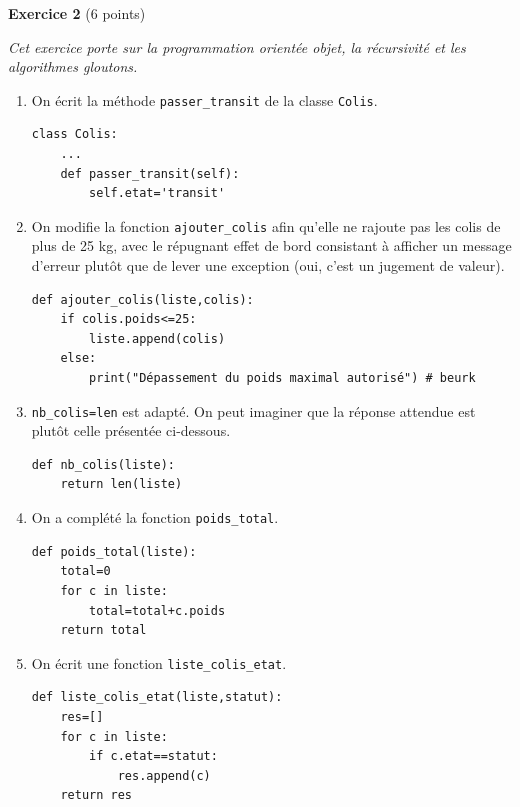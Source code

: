 \documentclass[11pt,a4paper]{article}
\newcommand{\mip}[1]{\texttt{#1}}
\begin{document}
\bigskip

\textbf{Exercice 2} (6 points)


\medskip

\textit{Cet exercice porte sur la programmation orientée objet, la récursivité et les algorithmes
gloutons.}



\begin{enumerate}
\item On écrit la méthode \mip{passer_transit} de la classe \mip{Colis}.

\begin{verbatim}
class Colis:
    ...
    def passer_transit(self):
        self.etat='transit'
\end{verbatim}

\item On modifie la fonction \mip{ajouter_colis} afin qu'elle ne rajoute pas les colis de plus de 25 kg, avec le répugnant effet de bord consistant à afficher un message d'erreur plutôt que de lever une exception (oui, c'est un jugement de valeur).

\begin{verbatim}
def ajouter_colis(liste,colis):
    if colis.poids<=25:
        liste.append(colis)
    else:
        print("Dépassement du poids maximal autorisé") # beurk
\end{verbatim}

\item \mip{nb_colis=len} est adapté. On peut imaginer que la réponse attendue est plutôt celle présentée ci-dessous.

\begin{verbatim}
def nb_colis(liste):
    return len(liste)
\end{verbatim}

\item  On a complété la fonction \mip{poids_total}.

\begin{verbatim}
def poids_total(liste):
    total=0
    for c in liste:
        total=total+c.poids
    return total
\end{verbatim}

\item On écrit une fonction \mip{liste_colis_etat}.

\begin{minipage}[t]{4cm}
\begin{verbatim}
def liste_colis_etat(liste,statut):
    res=[]
    for c in liste:
        if c.etat==statut:
            res.append(c)
    return res
\end{verbatim}
\end{minipage}


\end{enumerate}
\end{document}
